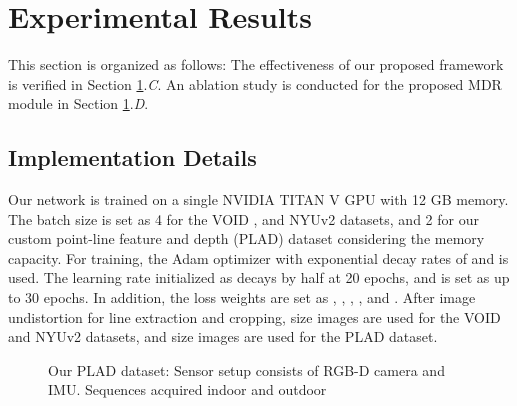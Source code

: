 \section{Experimental Results}\label{sec:exp_result}

\textcolor{color3}{
This section is organized as follows: The effectiveness of our proposed framework is verified in Section \ref{sec:exp_result}.\textit{C}. An ablation study is conducted for the proposed MDR module in Section \ref{sec:exp_result}.\textit{D}.
}




\subsection{Implementation Details}\label{sec:settings}


Our network is trained on a single NVIDIA TITAN V GPU with 12 GB memory. \textcolor{color1}{The batch} size is set \textcolor{color1}{as} 4 for \textcolor{color1}{the} VOID \cite{void}, \textcolor{color1}{and} NYUv2 \cite{nyuv2} \textcolor{color1}{datasets}, and 2 for our custom \textcolor{color1}{point-line feature and depth (PLAD)} dataset considering the memory capacity. 
For training, the Adam optimizer with exponential decay rates of  and  is used.
The learning rate initialized \textcolor{color1}{as}  decays by half at 20 epochs\textcolor{color1}{,} and is set \textcolor{color1}{as}  up to 30 epochs.
\textcolor{color1}{In addition}, \textcolor{color1}{the} loss weights are set \textcolor{color1}{as} , , , , and . 
After image undistortion for line extraction and cropping,  \textcolor{color1}{size images} are used for \textcolor{color1}{the} VOID and NYUv2 \textcolor{color1}{datasets}, and  size image\textcolor{color1}{s are} used for \textcolor{color1}{the} PLAD \textcolor{color1}{dataset}.

\begin{figure}[t!]
    \centering
    \caption{Our PLAD dataset: 
         Sensor setup consists of RGB-D camera and IMU. 
        \textcolor{color1}{S}equences \textcolor{color1}{acquired} 
         indoor and 
         outdoor
    }
    \label{fig:plad}
\end{figure}



